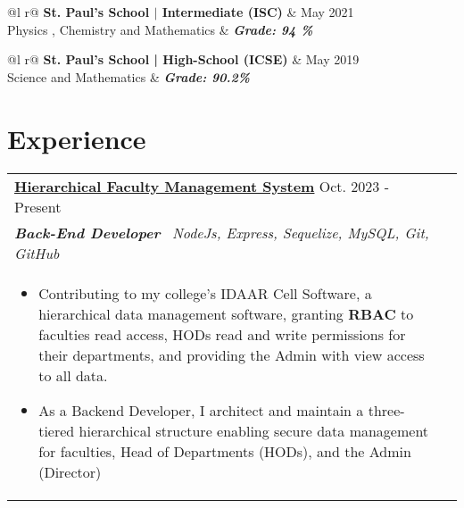 \documentclass[a4paper,8pt]{article}
\begin{document}
\begin{tabularx}{\linewidth}{ @{}l r@{} }
\color[HTML]{1C033C} \textbf{St. Paul's School $|$ Intermediate (ISC)} & \hfill \color[HTML]{1C033C} May 2021 \\
\color[HTML]{1C033C} Physics , Chemistry and Mathematics   & \hfill \color[HTML]{4B28A4} \textit{\textbf{Grade: 94 \%}} \\
\end{tabularx}

\begin{tabularx}{\linewidth}{ @{}l r@{} }
\color[HTML]{1C033C} \textbf{St. Paul's School | High-School (ICSE)} & \hfill \color[HTML]{1C033C} May 2019 \\
\color[HTML]{1C033C} Science and Mathematics  & \hfill \color[HTML]{4B28A4} \textit{\textbf{Grade: 90.2\%}} \\
\end{tabularx}


\color[HTML]{318CE7}\section{\textbf{Experience}}
\begin{tabularx}{\linewidth}{ @{}l r@{} }
\color[HTML]{1C033C}\textbf{\uline{ Hierarchical Faculty Management System}} \hfill \color[HTML]{1C033C} Oct. 2023 - Present\\[4pt]
\color[HTML]{1C033C}\textbf{\textit{Back-End Developer}}\ \hfill \color[HTML]{4B28A4} \textit{NodeJs, Express, Sequelize, MySQL, Git, GitHub} \\[5pt]
\begin{minipage}[t]{\linewidth}
    \begin{itemize}[nosep,after=\strut, leftmargin=2em, itemsep=2pt]
      \color[HTML]{1C033C}  \item Contributing to my college's IDAAR Cell Software,  a hierarchical data management software, granting \textbf{RBAC} to faculties read access, HODs read and write permissions for their departments, and providing the Admin with view access to all data.
        \item As a Backend Developer, I architect and maintain a three-tiered hierarchical structure enabling secure data management for faculties, Head of Departments (HODs), and the Admin (Director)
    \end{itemize}
\end{minipage}\end{tabularx}
\end{document}
